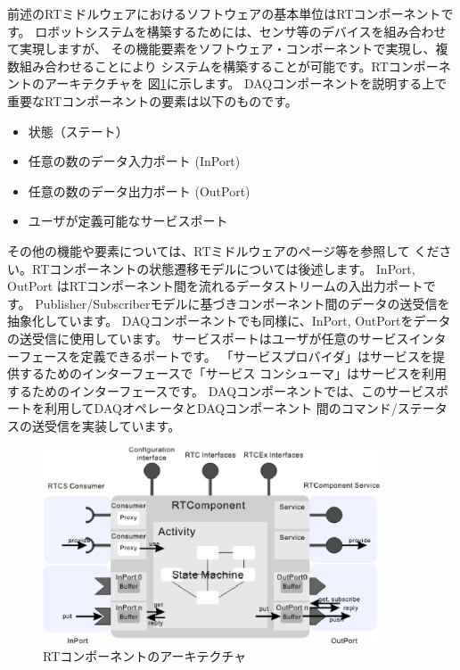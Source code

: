 \documentclass[a4j,10pt,dvips,onecolumn,oneside,final]{jarticle}%
\begin{document}
前述のRTミドルウェアにおけるソフトウェアの基本単位はRTコンポーネントです。
ロボットシステムを構築するためには、センサ等のデバイスを組み合わせて実現しますが、
その機能要素をソフトウェア・コンポーネントで実現し、複数組み合わせることにより
システムを構築することが可能です。RTコンポーネントのアーキテクチャを
図\ref{RT-component.fig}に示します。
DAQコンポーネントを説明する上で重要なRTコンポーネントの要素は以下のものです。
\begin{itemize}
\item 状態（ステート）
\item 任意の数のデータ入力ポート (InPort)
\item 任意の数のデータ出力ポート (OutPort)
\item ユーザが定義可能なサービスポート
\end{itemize}
その他の機能や要素については、RTミドルウェアのページ等\cite{RTM, RTM-book}を参照して
ください。RTコンポーネントの状態遷移モデルについては後述します。
InPort,  OutPort はRTコンポーネント間を流れるデータストリームの入出力ポートです。
Publisher/Subscriberモデルに基づきコンポーネント間のデータの送受信を抽象化しています。
DAQコンポーネントでも同様に、InPort,  OutPortをデータの送受信に使用しています。
サービスポートはユーザが任意のサービスインターフェースを定義できるポートです。
「サービスプロバイダ」はサービスを提供するためのインターフェースで「サービス
コンシューマ」はサービスを利用するためのインターフェースです。
DAQコンポーネントでは、このサービスポートを利用してDAQオペレータとDAQコンポーネント
間のコマンド/ステータスの送受信を実装しています。
\begin{figure}[htbp]
 \begin{center}
  \includegraphics[width=100mm]{RT-component.eps}
  \caption{RTコンポーネントのアーキテクチャ}
  \label{RT-component.fig}
 \end{center}
\end{figure}
\end{document}
